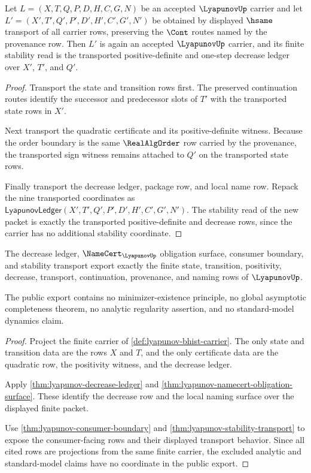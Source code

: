 \begin{theorem}
\label{thm:lyapunov-stability-transport}
Let $L=(X,T,Q,P,D,H,C,G,N)$ be an accepted $\LyapunovUp$ carrier and let
$L'=(X',T',Q',P',D',H',C',G',N')$ be obtained by displayed $\hsame$ transport of
all carrier rows, preserving the $\Cont$ routes named by the provenance row.
Then $L'$ is again an accepted $\LyapunovUp$ carrier, and its finite stability
read is the transported positive-definite and one-step decrease ledger over
$X'$, $T'$, and $Q'$.
\end{theorem}
\begin{proof}
Transport the state and transition rows first. The preserved continuation
routes identify the successor and predecessor slots of $T'$ with the
transported state rows in $X'$.

Next transport the quadratic certificate and its positive-definite witness.
Because the order boundary is the same $\RealAlgOrder$ row carried by the
provenance, the transported sign witness remains attached to $Q'$ on the
transported state rows.

Finally transport the decrease ledger, package row, and local name row. Repack
the nine transported coordinates as
$\mathsf{LyapunovLedger}(X',T',Q',P',D',H',C',G',N')$. The stability read of
the new packet is exactly the transported positive-definite and decrease rows,
since the carrier has no additional stability coordinate.
\end{proof}

\begin{theorem}
\label{thm:lyapunov-public-export}
The decrease ledger, $\NameCert_{\LyapunovUp}$ obligation surface, consumer
boundary, and stability transport export exactly the finite state, transition,
positivity, decrease, transport, continuation, provenance, and naming rows of
$\LyapunovUp$.

The public export contains no minimizer-existence principle, no global
asymptotic completeness theorem, no analytic regularity assertion, and no
standard-model dynamics claim.
\end{theorem}
\begin{proof}
Project the finite carrier of \autoref{def:lyapunov-bhist-carrier}. The only
state and transition data are the rows $X$ and $T$, and the only certificate
data are the quadratic row, the positivity witness, and the decrease ledger.

Apply \autoref{thm:lyapunov-decrease-ledger} and
\autoref{thm:lyapunov-namecert-obligation-surface}. These identify the
decrease row and the local naming surface over the displayed finite packet.

Use \autoref{thm:lyapunov-consumer-boundary} and
\autoref{thm:lyapunov-stability-transport} to expose the consumer-facing
rows and their displayed transport behavior. Since all cited rows are
projections from the same finite carrier, the excluded analytic and
standard-model claims have no coordinate in the public export.
\end{proof}

